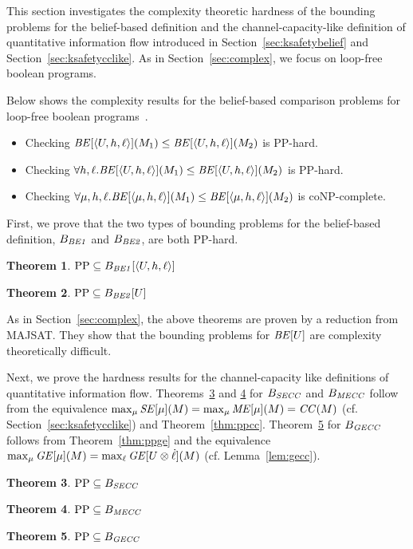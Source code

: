 \documentclass{llncs}
\newtheorem{theorem}{Theorem}[section]
\newcommand{\aseq}[1]{\langle#1\rangle}
\begin{document}
\label{sec:complexbeliefcclike}

This section investigates the complexity theoretic hardness of the
bounding problems for the belief-based definition and the
channel-capacity-like definition of quantitative information flow
introduced in Section~\ref{sec:ksafetybelief} and
Section~\ref{sec:ksafetycclike}.  As in Section~\ref{sec:complex}, we
focus on loop-free boolean programs.

Below shows the complexity results for the belief-based comparison
problems for loop-free boolean
programs~\cite{yasuoka:toplas2010submit}.
\begin{itemize}
\item[(1)] Checking ${\it BE}[\aseq{U,h,\ell}](M_1)
  \leq {\it BE}[\aseq{U,h,\ell}](M_2)$ is PP-hard.
\item[(2)] Checking $\forall h,\ell.{\it BE}[\aseq{U,h,\ell}](M_1)
  \leq {\it BE}[\aseq{U,h,\ell}](M_2)$ is PP-hard.
\item[(3)] Checking $\forall \mu,h,\ell.{\it BE}[\aseq{\mu,h,\ell}](M_1)
  \leq {\it BE}[\aseq{\mu,h,\ell}](M_2)$ is coNP-complete.
\end{itemize}

First, we prove that the two types of bounding problems for the
belief-based definition, $B_{\it BE1}$ and $B_{\it BE2}$, are both
PP-hard.
\begin{theorem}
\label{thm:ppbe1}
$\text{PP}\subseteq B_{\it BE1}[\aseq{U,h,\ell}]$
\end{theorem}
\begin{theorem}
\label{thm:ppbe2}
$\text{PP}\subseteq B_{\it BE2}[U]$
\end{theorem}
As in Section~\ref{sec:complex}, the above theorems are proven by
a reduction from MAJSAT.  They show that the bounding problems for
${\it BE}[U]$ are complexity theoretically difficult.

Next, we prove the hardness results for the channel-capacity like
definitions of quantitative information flow.
Theorems~\ref{thm:ppsecc} and \ref{thm:ppmecc} for $B_{\it SECC}$ and
$B_{\it MECC}$ follow from the equivalence $\max_\mu {\it SE}[\mu](M)
= \max_\mu {\it ME}[\mu](M) = {\it CC}(M)$
(cf. Section~\ref{sec:ksafetycclike}) and Theorem~\ref{thm:ppcc}.
Theorem~\ref{thm:ppgecc} for $B_{\it GECC}$ follows from
Theorem~\ref{thm:ppge} and the equivalence $\max_\mu {\it GE}[\mu](M)
= \max_\ell {\it GE}[U\otimes\dot{\ell}](M)$
(cf. Lemma~\ref{lem:gecc}).
\begin{theorem}
\label{thm:ppsecc}
  $\text{PP}\subseteq B_{\it SECC}$
\end{theorem}
\begin{theorem}
\label{thm:ppmecc}
  $\text{PP}\subseteq B_{\it MECC}$
\end{theorem}
\begin{theorem}
\label{thm:ppgecc}
  $\text{PP}\subseteq B_{\it GECC}$
\end{theorem}
\end{document}
